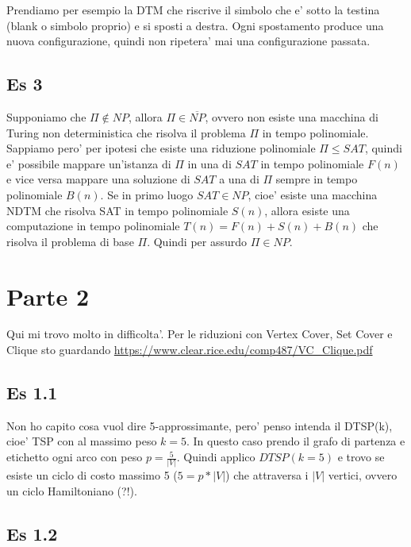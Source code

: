 \documentclass[a4paper,10pt,oneside]{book}
\begin{document}
Prendiamo per esempio la DTM che riscrive il simbolo che e' sotto la testina (blank o simbolo proprio) e si sposti a destra. Ogni spostamento produce una nuova configurazione, quindi non ripetera' mai una configurazione passata.

\subsection{Es 3}

Supponiamo che $\Pi \not \in NP$, allora $\Pi \in \overline {NP}$, ovvero non esiste una macchina di Turing non deterministica che risolva il problema $\Pi$ in tempo polinomiale. Sappiamo pero' per ipotesi che esiste una riduzione polinomiale $\Pi \leq SAT$, quindi e' possibile mappare un'istanza di $\Pi$ in una di $SAT$ in tempo polinomiale $F(n)$ e vice versa mappare una soluzione di $SAT$ a una di $\Pi$ sempre in tempo polinomiale $B(n)$. Se in primo luogo $SAT \in NP$, cioe' esiste una macchina NDTM che risolva SAT in tempo polinomiale $S(n)$, allora esiste una computazione in tempo polinomiale $T(n) = F(n) + S(n) + B(n)$ che risolva il problema di base $\Pi$. Quindi per assurdo $\Pi \in NP$.

\section{Parte 2}

Qui mi trovo molto in difficolta'. Per le riduzioni con Vertex Cover, Set Cover e Clique sto guardando \href{https://www.clear.rice.edu/comp487/VC\_Clique.pdf}{https://www.clear.rice.edu/comp487/VC\_Clique.pdf}

\subsection{Es 1.1}

Non ho capito cosa vuol dire 5-approssimante, pero' penso intenda il DTSP(k), cioe' TSP con al massimo peso $k = 5$. In questo caso prendo il grafo di partenza e etichetto ogni arco con peso $p = \frac {5} {|V|}$. Quindi applico $DTSP(k = 5)$ e trovo se esiste un ciclo di costo massimo 5 ($5 = p * |V|$) che attraversa i $|V|$ vertici, ovvero un ciclo Hamiltoniano (?!).

\subsection{Es 1.2}

\end{document}
